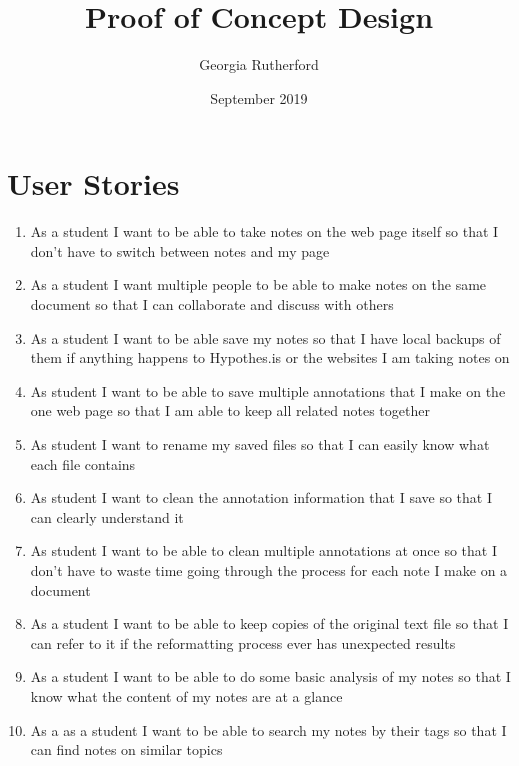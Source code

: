 \documentclass{article}
\title{Proof of Concept Design}
\author{Georgia Rutherford }
\date{September 2019}
\begin{document}
\maketitle

\section{User Stories}
\begin{enumerate}
\item As a student I want to be able to take notes on the web page itself so that I don't have to switch between notes and my page
\item As a student I want multiple people to be able to make notes on the same document so that I can collaborate and discuss with others
\item As a student I want to be able save my notes so that I have local backups of them if anything happens to Hypothes.is or the websites I am taking notes on
\item As  student I want to be able to save multiple annotations that I make on the one web page so that I am able to keep all related notes together
\item As student I want to rename my saved files so that I can easily know what each file contains
\item As student I want to clean the annotation information that I save so that I can clearly understand it
\item As student I want to be able to clean multiple annotations at once so that I don't have to waste time going through the process for each note I make on a document
\item As a student I want to be able to keep copies of the original text file so that I can refer to it if the reformatting process ever has unexpected results
\item As a student I want to be able to do some basic analysis of my notes so that I know what the content of my notes are at a glance
\item As a as a student I want to be able to search my notes by their tags so that I can find notes on similar topics
\end{enumerate}
\end{document}
